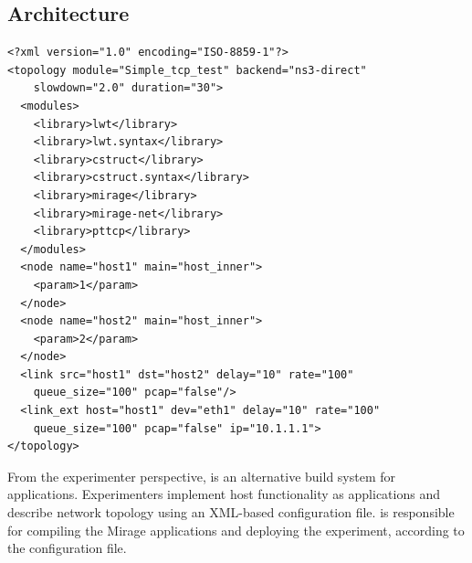 \subsection{\sdnsim Architecture} \label{sec:sdnsim-design}

\lstset{language=XML,
numberstyle=\footnotesize,
basicstyle=\ttfamily\footnotesize,
captionpos=b,
}
\begin{lstlisting}[caption={A sample \sdnsim configuration file interconnecting
  a server and a client host},label={lst:sdnsim-conf}]
<?xml version="1.0" encoding="ISO-8859-1"?>
<topology module="Simple_tcp_test" backend="ns3-direct" 
    slowdown="2.0" duration="30">
  <modules>
    <library>lwt</library>
    <library>lwt.syntax</library>
    <library>cstruct</library>
    <library>cstruct.syntax</library>
    <library>mirage</library>
    <library>mirage-net</library>
    <library>pttcp</library>
  </modules>
  <node name="host1" main="host_inner"> 
    <param>1</param>
  </node>
  <node name="host2" main="host_inner"> 
    <param>2</param>
  </node>
  <link src="host1" dst="host2" delay="10" rate="100" 
    queue_size="100" pcap="false"/>
  <link_ext host="host1" dev="eth1" delay="10" rate="100" 
    queue_size="100" pcap="false" ip="10.1.1.1">
</topology>
\end{lstlisting}

From the experimenter perspective, \sdnsim is an alternative build system for
\mirage applications. Experimenters implement host functionality as \mirage
applications and describe network topology using an XML-based configuration
file. \sdnsim is responsible for compiling the Mirage applications and
deploying the experiment, according to the configuration file. 

